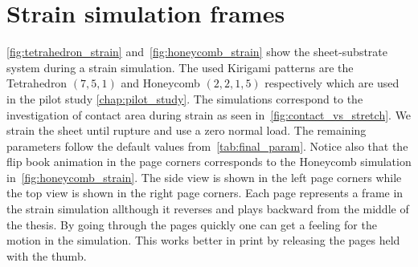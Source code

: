 \chapter{Strain simulation frames}\label{sec:sheet_stretch}
\cref{fig:tetrahedron_strain} and~\cref{fig:honeycomb_strain} show the
sheet-substrate system during a strain simulation. The used Kirigami patterns
are the Tetrahedron $(7,5,1)$ and Honeycomb $(2,2,1,5)$ respectively which are
used in the pilot study \cref{chap:pilot_study}. The simulations correspond to
the investigation of contact area during strain as seen
in~\cref{fig:contact_vs_stretch}. We strain the sheet until rupture and use a
zero normal load. The remaining parameters follow the default values
from~\cref{tab:final_param}. Notice also that the flip book animation in the page
corners corresponds to the Honeycomb simulation in~\cref{fig:honeycomb_strain}.
The side view is shown in the left page corners while the top view is shown in
the right page corners. Each page represents a frame in the strain simulation allthough it reverses and plays backward from the middle of the thesis. By going through the pages quickly one can get a feeling for the motion in the simulation. This works better in print by releasing the pages held with the thumb.
\newpage


